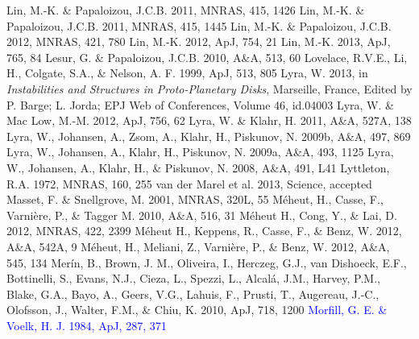 \documentclass[apj]{emulateapj}
\def\blue#1{\textcolor{blue}{#1}}
\begin{document}
\begin{thebibliography}{}
 Lin, M.-K. \& Papaloizou, J.C.B. 2011, MNRAS, 415, 1426
 Lin, M.-K. \& Papaloizou, J.C.B. 2011, MNRAS, 415, 1445
 Lin, M.-K. \& Papaloizou, J.C.B. 2012, MNRAS, 421, 780
 Lin, M.-K. 2012, ApJ, 754, 21
 Lin, M.-K. 2013, ApJ, 765, 84
 Lesur, G. \& Papaloizou, J.C.B. 2010, A\&A, 513, 60
 Lovelace, R.V.E., Li, H., Colgate, S.A., \& Nelson, A. F. 1999, ApJ, 513, 805
 Lyra, W. 2013, in {\it Instabilities and Structures in Proto-Planetary Disks}, Marseille, France, Edited by P. Barge; L. Jorda; EPJ Web of Conferences, Volume 46, id.04003 
 Lyra, W. \& Mac Low, M.-M. 2012, ApJ, 756, 62
 Lyra, W. \& Klahr,  H. 2011, A\&A, 527A, 138
 Lyra, W., Johansen, A., Zsom, A., Klahr, H., Piskunov, N. 2009b, A\&A, 497, 869
 Lyra, W., Johansen, A., Klahr, H., Piskunov, N. 2009a, A\&A, 493, 1125 
 Lyra, W., Johansen, A., Klahr, H., \& Piskunov, N. 2008, A\&A, 491, L41
 Lyttleton, R.A. 1972, MNRAS, 160, 255
 van der Marel et al. 2013, Science, accepted
 Masset, F. \& Snellgrove, M. 2001, MNRAS, 320L, 55
 M\'eheut, H., Casse, F., Varni\`ere, P., \& Tagger M. 2010, A\&A, 516, 31
 M\'eheut H., Cong, Y., \& Lai, D. 2012, MNRAS, 422, 2399
 M\'eheut H., Keppens,  R., Casse, F., \& Benz, W. 2012, A\&A, 542A, 9
 M\'eheut, H., Meliani, Z., Varni\`ere, P., \& Benz, W. 2012, A\&A, 545, 134
 Mer\'in, B., Brown, J. M., Oliveira, I., Herczeg, G.J., van Dishoeck, E.F., Bottinelli, S., Evans, N.J., Cieza, L., Spezzi, L., Alcal\'a, J.M., Harvey, P.M., Blake, G.A., Bayo, A., Geers, V.G., Lahuis, F., Prusti, T., Augereau, J.-C., Olofsson, J., Walter, F.M., \& Chiu, K. 2010, ApJ, 718, 1200
\bibitem[{{\blue{Morfill \& V\"olk}}(1984)}]{Morfill-Volk84}\blue{Morfill, G. E. \& Voelk, H. J. 1984, ApJ, 287, 371}

\end{thebibliography}
\end{document}
